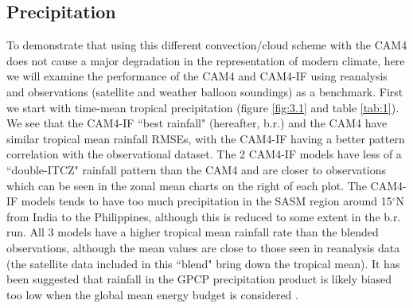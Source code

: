 \documentclass[letterpaper,12pt,titlepage,oneside,final]{book}
\begin{document}
\subsection{Precipitation}
To demonstrate that using this different convection/cloud scheme with the CAM4 does not cause a major degradation in the representation of modern climate, here we will examine the performance of the CAM4 and CAM4-IF using reanalysis and observations (satellite and weather balloon soundings) as a benchmark. First we start with time-mean tropical precipitation (figure \ref{fig:3.1} and table \ref{tab:1}). We see that the CAM4-IF ``best rainfall" (hereafter, b.r.) and the CAM4 have similar tropical mean rainfall RMSEs, with the CAM4-IF having a better pattern correlation with the observational dataset. The 2 CAM4-IF models  have less of a ``double-ITCZ" rainfall pattern than the CAM4 and are closer to observations which can be seen in the zonal mean charts on the right of each plot. The CAM4-IF models tends to have too much precipitation in the SASM region around 15$^\circ$N from India to the Philippines, although this is reduced to some extent in the b.r. run. All 3 models have a higher tropical mean rainfall rate than the blended observations, although the mean values are close to those seen in reanalysis data (the satellite data included in this ``blend" bring down the tropical mean). It has been suggested that rainfall in the GPCP precipitation product is likely biased too low when the global mean energy budget is considered \citep{trenberth_earths_2009,trenberth_regional_2013}.
\end{document}
